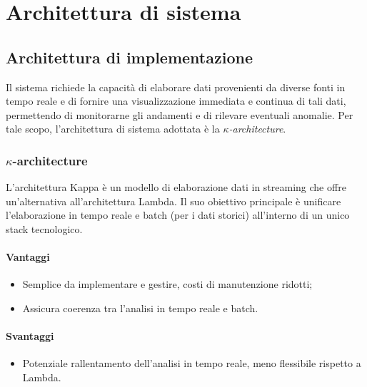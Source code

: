 \section{Architettura di sistema}
\subsection{Architettura di implementazione}
Il sistema richiede la capacità di elaborare dati provenienti da diverse fonti in tempo reale e di fornire una visualizzazione immediata e continua di tali dati, permettendo di monitorarne gli andamenti e di rilevare eventuali anomalie. 
Per tale scopo, l'architettura di sistema adottata è la \textit{$\kappa$-architecture}.

\subsubsection{$\kappa$-architecture}
L'architettura Kappa è un modello di elaborazione dati in streaming che offre un'alternativa all'architettura Lambda. Il suo obiettivo principale è unificare l'elaborazione in tempo reale e batch (per i dati storici) all'interno di un unico stack tecnologico.
\paragraph{Vantaggi}
\begin{itemize}
    \item Semplice da implementare e gestire, costi di manutenzione ridotti;
    \item Assicura coerenza tra l'analisi in tempo reale e batch.
\end{itemize}
\paragraph*{Svantaggi}
\begin{itemize}
    \item Potenziale rallentamento dell'analisi in tempo reale, meno flessibile rispetto a Lambda.
\end{itemize}

